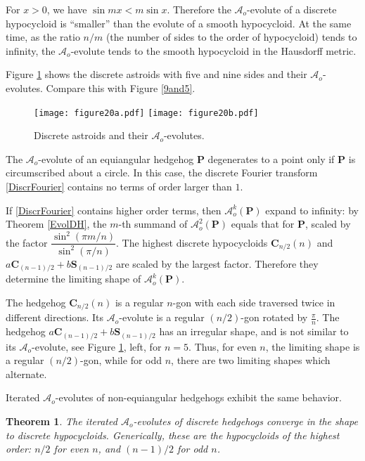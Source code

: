 \documentclass[12pt]{article}
\newtheorem{theorem}{Theorem}
\newcommand{\Aeo}{\mathcal{A}_o}
\renewcommand{\P}{\mathbf{P}}
\begin{document}
For $x>0$, we have $\sin mx < m\sin x$. Therefore the $\Aeo$-evolute of a discrete hypocycloid is ``smaller'' than the evolute of a smooth hypocycloid. At the same time, as the ratio $n/m$ (the number of sides to the order of hypocycloid) tends to infinity, the $\Aeo$-evolute tends to the smooth hypocycloid in the Hausdorff metric.

Figure \ref{5and9} shows the discrete astroids with five and nine sides and their $\Aeo$-evolutes. Compare this with Figure \ref{9and5}.

\begin{figure}[htbp]
\centering
\texttt{[image: figure20a.pdf]}
\hbox{\texttt{[image: figure20b.pdf]}}
\caption{Discrete astroids and their $\Aeo$-evolutes.}
\label{5and9}
\end{figure}

The $\Aeo$-evolute of an equiangular hedgehog $\P$ degenerates to a point only if $\P$ is circumscribed about a circle. In this case, the discrete Fourier transform \eqref{DiscrFourier} contains no terms of order larger than $1$.

If \eqref{DiscrFourier}  contains higher order terms, then  $\Aeo^k(\P)$ expand to infinity: by Theorem \ref{EvolDH}, the $m$-th summand of $\Aeo^2(\P)$ equals that for $\P$, scaled by the factor $\dfrac{\sin^2(\pi m/n)}{\sin^2(\pi/n)}$. The highest discrete hypocycloids $\mathbf{C}_{n/2}(n)$ and $a \mathbf{C}_{(n-1)/2} + b \mathbf{S}_{(n-1)/2}$ are scaled by the largest factor. Therefore they determine the limiting shape of $\Aeo^k(\P)$.

The hedgehog $\mathbf{C}_{n/2}(n)$ is a regular $n$-gon with each side traversed twice in different directions. Its $\Aeo$-evolute is a regular $(n/2)$-gon rotated by $\frac{\pi}n$. The hedgehog $a \mathbf{C}_{(n-1)/2} + b \mathbf{S}_{(n-1)/2}$ has an irregular shape, and is not similar to its $\Aeo$-evolute, see Figure \ref{5and9}, left, for  $n=5$. Thus, for even $n$, the limiting shape is a regular $(n/2)$-gon, while for odd $n$, there are two limiting shapes which alternate.

Iterated $\Aeo$-evolutes of non-equiangular hedgehogs exhibit the same behavior.

\begin{theorem}
\label{AngleEvolShapes}
The iterated $\Aeo$-evolutes of discrete hedgehogs converge in the shape to discrete hypocycloids. Generically, these are the hypocycloids of the highest order: $n/2$ for even $n$, and $(n-1)/2$ for odd $n$.
\end{theorem}
\end{document}
